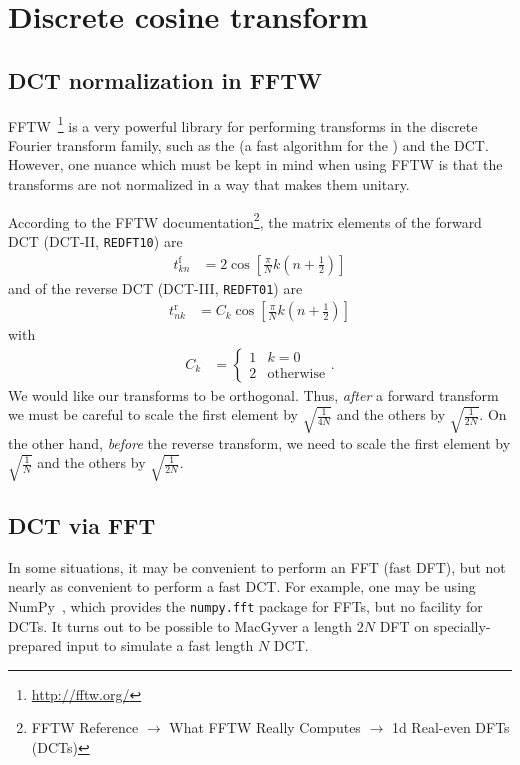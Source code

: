 \chapter{Discrete cosine transform}

\label{chap:dct}


\section{DCT normalization in FFTW}

FFTW~\cite{frigo2005design}\footnote{
	\url{http://fftw.org/}
} is a very powerful library for performing transforms in the discrete Fourier transform family, such as the  (a fast algorithm for the ) and the DCT.
However, one nuance which must be kept in mind when using FFTW is that the transforms are not normalized in a way that makes them unitary.

According to the FFTW documentation\footnote{
	FFTW Reference $\to$ What FFTW Really Computes $\to$ 1d Real-even DFTs (DCTs)
}, the matrix elements of the forward DCT (DCT-II, \texttt{REDFT10}) are
\begin{align}
	t^\textrm{f}_{kn}
	&= 2 \cos{\left[ \frac{\pi}{N} k \left( n + \frac{1}{2} \right) \right]}
\end{align}
and of the reverse DCT (DCT-III, \texttt{REDFT01}) are
\begin{align}
	t^\textrm{r}_{nk}
	&= C_k \cos{\left[ \frac{\pi}{N} k \left( n + \frac{1}{2} \right) \right]}
\end{align}
with
\begin{align}
	C_k
	&= \begin{cases}
			1 & k = 0 \\
			2 & \text{otherwise}
		\end{cases}.
\end{align}
We would like our transforms to be orthogonal.
Thus, \emph{after} a forward transform we must be careful to scale the first element by $\sqrt{\frac{1}{4 N}}$ and the others by $\sqrt{\frac{1}{2 N}}$.
On the other hand, \emph{before} the reverse transform, we need to scale the first element by $\sqrt{\frac{1}{N}}$ and the others by $\sqrt{\frac{1}{2 N}}$.


\section{DCT via FFT}

In some situations, it may be convenient to perform an FFT (fast DFT), but not nearly as convenient to perform a fast DCT.
For example, one may be using NumPy~\cite{van2011numpy}, which provides the \texttt{numpy.fft} package for FFTs, but no facility for DCTs.
It turns out to be possible to MacGyver a length $2 N$ DFT on specially-prepared input to simulate a fast length $N$ DCT.

